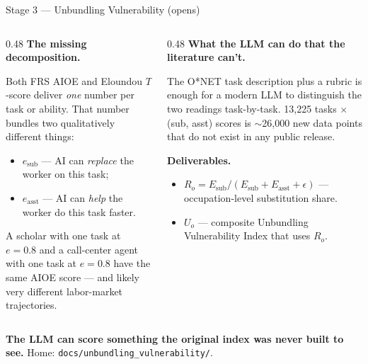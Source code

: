\documentclass[10pt,english,aspectratio=169]{beamer}
\begin{document}
\begin{frame}{Stage 3 --- Unbundling Vulnerability (opens)}
\begin{columns}[T]
\begin{column}{0.48\textwidth}
\textbf{The missing decomposition.}

Both FRS AIOE and Eloundou $T$-score deliver \emph{one} number per task or ability. That number bundles two qualitatively different things:
\begin{itemize}\small
  \item $e_{\text{sub}}$ --- AI can \emph{replace} the worker on this task;
  \item $e_{\text{asst}}$ --- AI can \emph{help} the worker do this task faster.
\end{itemize}

\vspace{0.1cm}
A scholar with one task at $e=0.8$ and a call-center agent with one task at $e=0.8$ have the same AIOE score --- and likely very different labor-market trajectories.
\end{column}
\begin{column}{0.48\textwidth}
\textbf{What the LLM can do that the literature can't.}

The O*NET task description plus a rubric is enough for a modern LLM to distinguish the two readings task-by-task. 13{,}225 tasks $\times$ (sub, asst) scores is $\sim$26{,}000 new data points that do not exist in any public release.

\vspace{0.15cm}
\textbf{Deliverables.}
\begin{itemize}\small
  \item $R_o = E_{\text{sub}}/(E_{\text{sub}}+E_{\text{asst}}+\epsilon)$ --- occupation-level substitution share.
  \item $U_o$ --- composite Unbundling Vulnerability Index that uses $R_o$.
\end{itemize}
\end{column}
\end{columns}

\vspace{0.2cm}
\begin{tcolorbox}[colback=blue!3,colframe=RedTitle!60]\scriptsize
\textbf{The LLM can score something the original index was never built to see.} Home: \texttt{docs/unbundling\_vulnerability/}.
\end{tcolorbox}
\end{frame}
\end{document}
